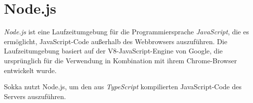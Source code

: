 \section{Node.js}

\textit{Node.js} ist eine Laufzeitumgebung für die Programmiersprache \textit{JavaScript}, die es ermöglicht, JavaScript-Code außerhalb des Webbrowsers auszuführen. Die Laufzeitumgebung basiert auf der V8-JavaScript-Engine von Google, die ursprünglich für die Verwendung in Kombination mit ihrem Chrome-Browser entwickelt wurde. \cite{springer2013}

Sokka nutzt Node.js, um den aus \textit{TypeScript} kompilierten JavaScript-Code des Servers auszuführen.